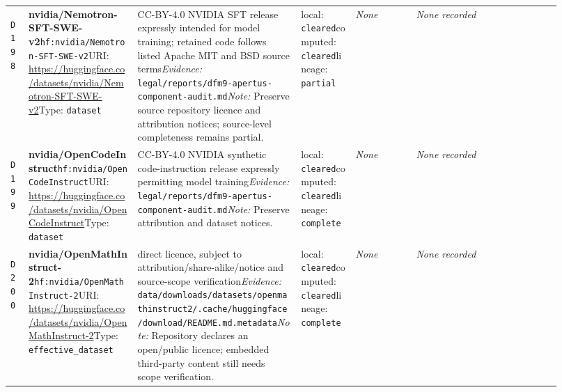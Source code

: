 \documentclass[9pt,a4paper]{article}
\newcommand{\depid}[1]{\hypertarget{dep:#1}{\texttt{#1}}}
\begin{document}
\begin{landscape}
\begin{longtable}{@{}L{0.035\linewidth}L{0.185\linewidth}L{0.27\linewidth}L{0.09\linewidth}L{0.10\linewidth}L{0.24\linewidth}@{}}
\depid{D198} & \textbf{nvidia/Nemotron-SFT-SWE-v2}\newline \nolinkurl{hf:nvidia/Nemotron-SFT-SWE-v2}\newline URI: \url{https://huggingface.co/datasets/nvidia/Nemotron-SFT-SWE-v2}\newline Type: \texttt{dataset} & CC-BY-4.0 NVIDIA SFT release expressly intended for model training; retained code follows listed Apache MIT and BSD source terms\newline \textit{Evidence:} \nolinkurl{legal/reports/dfm9-apertus-component-audit.md}\newline \textit{Note:} Preserve source repository licence and attribution notices; source-level completeness remains partial. & local: \texttt{cleared}\newline computed: \texttt{cleared}\newline lineage: \texttt{partial} & \textit{None} & \textit{None recorded} \\
\depid{D199} & \textbf{nvidia/OpenCodeInstruct}\newline \nolinkurl{hf:nvidia/OpenCodeInstruct}\newline URI: \url{https://huggingface.co/datasets/nvidia/OpenCodeInstruct}\newline Type: \texttt{dataset} & CC-BY-4.0 NVIDIA synthetic code-instruction release expressly permitting model training\newline \textit{Evidence:} \nolinkurl{legal/reports/dfm9-apertus-component-audit.md}\newline \textit{Note:} Preserve attribution and dataset notices. & local: \texttt{cleared}\newline computed: \texttt{cleared}\newline lineage: \texttt{complete} & \textit{None} & \textit{None recorded} \\
\depid{D200} & \textbf{nvidia/OpenMathInstruct-2}\newline \nolinkurl{hf:nvidia/OpenMathInstruct-2}\newline URI: \url{https://huggingface.co/datasets/nvidia/OpenMathInstruct-2}\newline Type: \texttt{effective\_dataset} & direct licence, subject to attribution/share-alike/notice and source-scope verification\newline \textit{Evidence:} \nolinkurl{data/downloads/datasets/openmathinstruct2/.cache/huggingface/download/README.md.metadata}\newline \textit{Note:} Repository declares an open/public licence; embedded third-party content still needs scope verification. & local: \texttt{cleared}\newline computed: \texttt{cleared}\newline lineage: \texttt{complete} & \textit{None} & \textit{None recorded} \\

\end{longtable}
\end{landscape}
\end{document}
